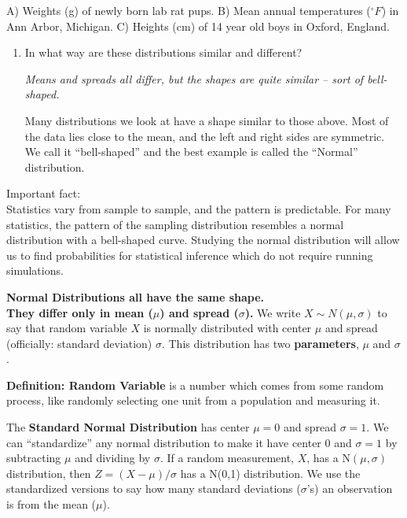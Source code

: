 A) Weights (g) of newly born lab rat pups. 
B) Mean annual temperatures ($^\circ F$) in Ann Arbor, Michigan.
C) Heights (cm) of 14 year old boys in Oxford, England. \vspace{-.1in}


\begin{enumerate}
  \item  In what way are these distributions similar and different?
\begin{students}
        \vspace{3cm}        
\end{students}

\begin{key}
{\it Means and spreads all differ, but the shapes are quite
  similar -- sort of bell-shaped. }
\end{key}

  Many distributions we look at have a shape similar to those above.
  Most of the data lies close to the mean, and the left and right
  sides are symmetric.  We call it ``bell-shaped'' and the best example is
  called the ``Normal'' distribution.
\end{enumerate}

Important fact:\\
{\sf Statistics vary from sample to sample, and the pattern is
  predictable.  For many statistics, the pattern of the sampling
  distribution resembles a normal distribution with a bell-shaped
  curve. }  Studying the normal distribution will allow us to find
probabilities for statistical inference which do not require running
simulations.

 {\bf Normal Distributions all have the same shape.\\
They differ only in mean ($\mu$) and spread ($\sigma$).}  We write $X
\sim N(\mu, \sigma)$ to say that random variable $X$ is normally
distributed with center $\mu$ and spread (officially: standard
deviation) $\sigma$.  This distribution
has two {\bf parameters}, $\mu$ and $\sigma$. 

{\bf Definition:  Random Variable} is a number which comes from some
random process, like randomly selecting one unit from a population and
measuring it.

The  {\bf Standard Normal Distribution} has center $\mu=0$ and spread
$\sigma = 1$.  We can ``standardize'' any normal distribution to make
it have center 0 and $\sigma = 1$ by subtracting $\mu$ and dividing by
$\sigma$. If a random measurement, $X$, has a N$(\mu, \sigma)$
distribution, then $Z = (X - \mu)/\sigma$ has a N(0,1) distribution. 
We use the standardized versions to say how many standard deviations
($\sigma$'s) an observation is from the mean ($\mu$). 



